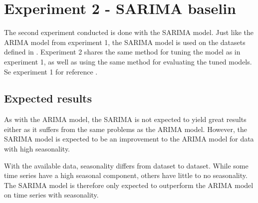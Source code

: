   \section{Experiment 2 - SARIMA baselin}
  \label{section:Method:Experiment2}

  The second experiment conducted is done with the SARIMA model.
  Just like the ARIMA model from experiment 1, the SARIMA model is used on the datasets defined in .
  Experiment 2 shares the same method for tuning the model as in experiment 1,
  as well as using the same method for evaluating the tuned models.
  Se experiment 1 for reference .

  \subsection{Expected results}
  As with the ARIMA model, the SARIMA is not expected to yield great results either as it suffers from the same problems as the ARIMA model.
  However, the SARIMA model is expected to be an improvement to the ARIMA model for data with high seasonality.

  With the available data, seasonality differs from dataset to dataset. While some time series have a high seasonal component,
  others have little to no seasonality.
  The SARIMA model is therefore only expected to outperform the ARIMA model on time series with seasonality.

\fi
